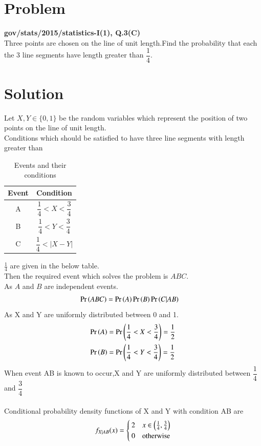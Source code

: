\documentclass[journal,12pt,twocolumn]{IEEEtran}
\begin{document}
\section{Problem}
\textbf{gov/stats/2015/statistics-I(1), Q.3(C)}\\
  Three points are chosen on the line of unit length.Find the probability that each the 3 line segments have length greater than $\dfrac{1}{4}$.
\section{Solution}
 Let $X,Y \in \{0,1\}$ be the random variables which represent the position of two points on the line of unit length.\\
Conditions which should be satisfied to have three line segments with length greater than 
\begin{table}[h]
\centering
\bgroup
\def\arraystretch{2}
\begin{tabular}{|c|c|}
\hline
\textbf{Event} & \textbf{Condition}                     \\\hline
A              & $\dfrac{1}{4}<X<\dfrac{3}{4}$ \\[1ex] \hline
B              & $\dfrac{1}{4}<Y<\dfrac{3}{4}$ \\[1ex] \hline
C              & $\dfrac{1}{4}<|X-Y|$ \\[1ex] \hline
\end{tabular}
\egroup
\caption{Events and their conditions}
\label{tab:Events}
\end{table}
$\frac{1}{4}$ are given in the below table.\\
Then the required event which solves the problem is $ABC$.\\
As $A$ and $B$ are independent events.
\begin{align}
    \Pr\left(ABC\right)&=\Pr\left(A\right)\Pr\left(B\right)\Pr\left(C|AB\right)
\end{align}
As X and Y are uniformly distributed between 0 and 1.
\begin{align}
    \Pr\left(A\right)&=\Pr\left(\dfrac{1}{4}<X<\dfrac{3}{4}\right)=\dfrac{1}{2}\\
    \Pr\left(B\right)&=\Pr\left(\dfrac{1}{4}<Y<\dfrac{3}{4}\right)=\dfrac{1}{2}
\end{align}
When event AB is known to occur,X and Y are uniformly distributed between $\dfrac{1}{4}$ and $\dfrac{3}{4}$\\\\ 
Conditional probability density functions of X and Y with condition AB are
\begin{align}
    f_{X|AB}(x) = 
    \begin{cases}
    2 & x\in \left(\frac{1}{4},\frac{3}{4}\right)\\
    0 & \text{otherwise}
    \end{cases}
\end{align}
\end{document}
